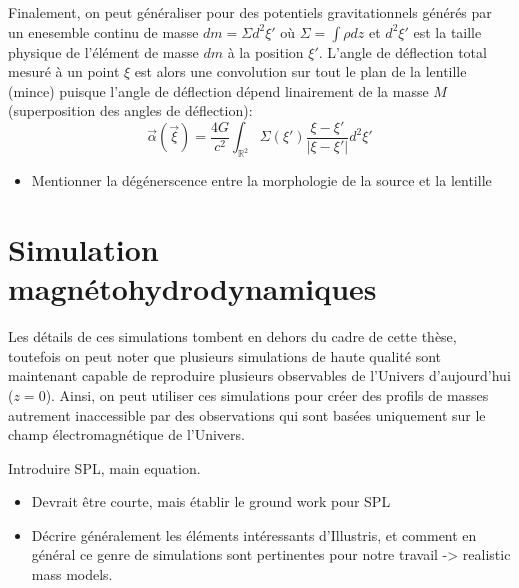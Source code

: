 Finalement, on peut généraliser pour des potentiels gravitationnels générés 
par un enesemble continu de masse $dm = \Sigma d^{2}\xi'$ où $\Sigma = \int \rho dz$ et 
$d^{2} \xi'$ est la taille physique de l'élément de masse $dm$ à la position $\xi'$. 
L'angle de déflection total mesuré à un point $\xi$ est alors une convolution 
sur tout le plan de la lentille (mince) puisque l'angle de déflection dépend 
linairement de la masse $M$ (superposition des angles de déflection):
\begin{equation}\label{eq:}
        \vec{\alpha}(\vec{\xi}) = \frac{4 G}{c^{2}} \int_{\mathbb{R}^{2}} \Sigma (\xi') \frac{\xi - \xi'}{|\xi - \xi'|}d^{2}\xi'
\end{equation} 
\begin{itemize}
        \item Mentionner la dégénerscence entre la morphologie de la source et la 
                lentille
\end{itemize}

\section{Simulation magnétohydrodynamiques}\label{sec:simulation magnetohydrodynamique}
Les détails de ces simulations tombent en dehors du cadre de cette thèse, 
toutefois on peut noter que plusieurs simulations de haute qualité sont maintenant 
capable de reproduire plusieurs observables de l'Univers d'aujourd'hui ($z=0$). 
Ainsi, on peut utiliser ces simulations pour créer des profils de masses 
autrement inaccessible par des observations qui sont basées uniquement 
sur le champ électromagnétique de l'Univers.

Introduire SPL, main equation.
\begin{itemize}
        \item Devrait être courte, mais établir le ground work pour 
                SPL
        \item Décrire généralement les éléments intéressants d'Illustris, et
                comment en général ce genre de simulations sont pertinentes 
                pour notre travail -> realistic mass models.
\end{itemize}

